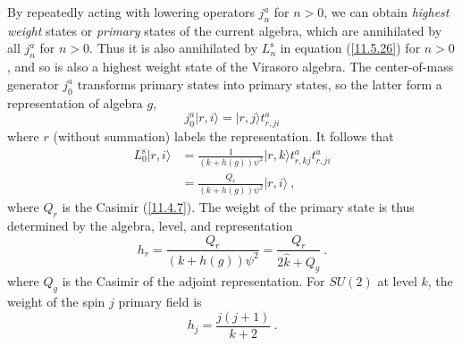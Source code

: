 By repeatedly acting with lowering operators $j_{n}^{a}$ for $n>0$, we can obtain \emph{highest weight} states or \emph{primary} states of the current algebra, which are annihilated by all $j_{n}^{a}$ for $n>0$. Thus it is also annihilated by $L_{n}^{\mathrm{s}}$ in equation (\ref{11.5.26}) for $n>0$, and so is also a highest weight state of the Virasoro algebra. The center-of-mass generator $j_{0}^{a}$ transforms primary states into primary states, so the latter form a representation of algebra $g$,
\begin{equation}
	j_{0}^{a}\lvert r,i\rangle = \lvert r,j\rangle t_{r,ji}^{a} \label{11.5.38}
\end{equation}
where $r$ (without summation) labels the representation. It follows that
\begin{align}
	L_{0}^{\mathrm{s}}\lvert r,i\rangle &= \frac{1}{(k+h(g))\psi^{2}} \lvert r,k \rangle t_{r,kj}^{a}t_{r,ji}^{a} \nonumber\\ 
	&= \frac{Q_{r}}{(k+h(g))\psi^{2}} \lvert r,i \rangle \:, \label{11.5.39}
\end{align}
where $Q_{r}$ is the Casimir (\ref{11.4.7}). The weight of the primary state is thus determined by the algebra, level, and representation
\begin{equation}
	h_{r} = \frac{Q_{r}}{(k+h(g))\psi^{2}} = \frac{Q_{r}}{2\hat{k}+Q_{g}} \:. \label{11.5.40}
\end{equation}
where $Q_{g}$ is the Casimir of the adjoint representation. For $SU(2)$ at level $k$, the weight of the spin $j$ primary field is
\begin{equation}
	h_{j} = \frac{j(j+1)}{k+2} \:. \label{11.5.41}
\end{equation}
